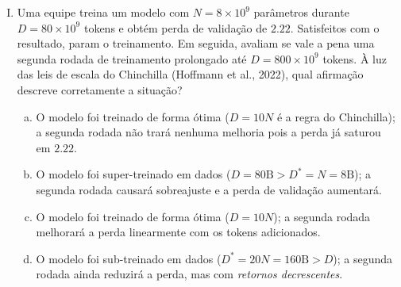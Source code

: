 \documentclass{dlproblemset}
\begin{document}
\begin{enumerate}[I)]
O draft propõe $\tilde{x}$. Qual é a probabilidade de aceitação de
$\tilde{x}$ e, caso rejeitado, de qual distribuição é re-amostrado o
token substituto?

\begin{enumerate}[a)]
    \item Aceitação $= 1.00$ (sempre aceito, pois $p(\tilde{x}) > 0$);
          substituto amostrado de $p$ sem modificação.
    \item Aceitação $= 0.50$; substituto amostrado de
          $p'(x) \propto \max\!\bigl(0,\,p(x)-q(x)\bigr)$.
    \item Aceitação $= 0.50$; substituto amostrado
          uniformemente sobre o vocabulário.
    \item Aceitação $= 0.30$; substituto amostrado de $q$, a distribuição
          do próprio \textit{draft}.
\end{enumerate}

\item Uma equipe treina um modelo com $N = 8 \times 10^9$ parâmetros durante
      $D = 80 \times 10^9$ tokens e obtém perda de validação de $2.22$.
      Satisfeitos com o resultado, param o treinamento.
      Em seguida, avaliam se vale a pena uma segunda rodada de treinamento
      prolongado até $D = 800 \times 10^9$ tokens.
      À luz das leis de escala do Chinchilla (Hoffmann et al., 2022),
      qual afirmação descreve corretamente a situação?

\begin{enumerate}[a)]
    \item O modelo foi treinado de forma ótima ($D = 10N$ é a
          regra do Chinchilla); a segunda rodada não trará nenhuma melhoria
          pois a perda já saturou em $2.22$.
    \item O modelo foi super-treinado em dados ($D = 80\text{B} > D^* = N = 8\text{B}$);
          a segunda rodada causará sobreajuste e a perda de validação
          aumentará.
    \item O modelo foi treinado de forma ótima ($D = 10N$);
          a segunda rodada melhorará a perda linearmente com os tokens
          adicionados.
    \item O modelo foi sub-treinado em dados ($D^* = 20N = 160\text{B} > D$);
          a segunda rodada ainda reduzirá a perda, mas com
          \emph{retornos decrescentes}.
\end{enumerate}


\end{enumerate}
\end{document}
